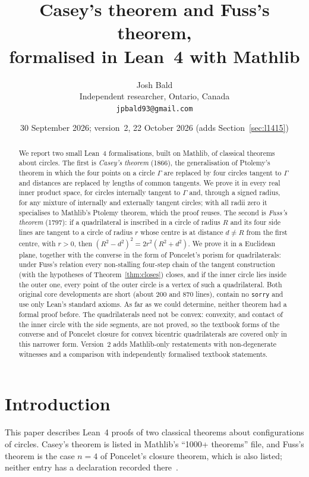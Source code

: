 \documentclass[11pt]{article}
\title{Casey's theorem and Fuss's theorem,\\ formalised in Lean~4 with Mathlib}
\author{Josh Bald\\ \small Independent researcher, Ontario, Canada\\ \small\texttt{jpbald93@gmail.com}}
\date{30 September 2026; version~2, 22 October 2026 (adds Section~\ref{sec:l1415})}
\theoremstyle{definition}
\theoremstyle{remark}
\newcommand{\code}[1]{\texttt{#1}}
\begin{document}
\maketitle

\begin{abstract}
We report two small Lean~4 formalisations, built on Mathlib, of classical theorems about circles.
The first is \emph{Casey's theorem} (1866), the generalisation of Ptolemy's theorem in which the
four points on a circle $\Gamma$ are replaced by four circles tangent to $\Gamma$ and distances are
replaced by lengths of common tangents. We prove it in every real inner product space, for circles
internally tangent to $\Gamma$ and, through a signed radius, for any mixture of internally and
externally tangent circles; with all radii zero it specialises to Mathlib's Ptolemy theorem, which
the proof reuses. The second is \emph{Fuss's theorem} (1797): if a quadrilateral is inscribed in a
circle of radius $R$ and its four side lines are tangent to a circle of radius $r$ whose centre is at
distance $d\ne R$ from the first centre, with $r>0$, then $(R^2-d^2)^2=2r^2(R^2+d^2)$. We prove it in a Euclidean
plane, together with the converse in the form of Poncelet's porism for quadrilaterals: under Fuss's
relation every non-stalling four-step chain of the tangent construction (with the hypotheses of
Theorem~\ref{thm:closes}) closes, and if the inner circle lies inside
the outer one, every point of the outer circle is a vertex of such a quadrilateral. Both
original core developments are short (about 200 and 870 lines), contain no \code{sorry} and use only Lean's
standard axioms. As far as we could determine, neither theorem had a formal proof before.
The quadrilaterals need not be convex: convexity, and contact of the inner circle with the side
segments, are not proved, so the textbook forms of the converse and of Poncelet closure for convex
bicentric quadrilaterals are covered only in this narrower form. Version~2 adds Mathlib-only
restatements with non-degenerate witnesses and a comparison with independently formalised textbook
statements.
\end{abstract}

\section{Introduction}

This paper describes Lean~4 proofs of two classical theorems about configurations of circles.
Casey's theorem is listed in Mathlib's ``1000+ theorems'' file, and Fuss's theorem is the case $n=4$ of
Poncelet's closure theorem, which is also listed; neither entry has a declaration recorded
there~\cite{Mathlib1000}.
\end{document}
